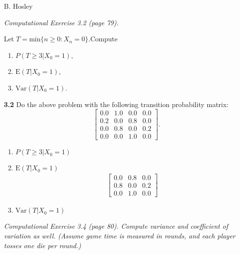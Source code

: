 \documentclass[answers]{exam}
\begin{document}
\hspace{\fill} {\large B. Hosley}
\bigskip


\begin{questions}

\question 
\textit{Computational Exercise 3.2 (page 79).}

Let \(T =\text{min}\{n\geq0:X_n =0\}\).Compute
\begin{enumerate}
	\item \(P(T \geq 3|X_0 = 1)\), 
	\item \(\text{E}(T|X_0 =1)\),
	\item \(\text{Var}(T |X_0 = 1)\).
\end{enumerate}


\textbf{3.2} Do the above problem with the following transition probability matrix:
\[\begin{bmatrix}
	0.0 & 1.0 & 0.0 & 0.0 \\
	0.2 & 0.0 & 0.8 & 0.0 \\
	0.0 & 0.8 & 0.0 & 0.2 \\
	0.0 & 0.0 & 1.0 & 0.0 
\end{bmatrix}.\]

\begin{solution}
\begin{enumerate}
	\item \(P(T \geq 3|X_0 = 1)\)
	
	
	\item \(\text{E}(T|X_0 =1)\)
	\begin{align*}
		\begin{bmatrix}
			0.0 & 0.8 & 0.0 \\
			0.8 & 0.0 & 0.2 \\
			0.0 & 1.0 & 0.0 
		\end{bmatrix}
	\end{align*}
	
	
	\item \(\text{Var}(T |X_0 = 1)\)
	
\end{enumerate}
\end{solution}

\question 
\textit{Computational Exercise 3.4 (page 80). 
	Compute variance and coefficient of variation as well. 
	(Assume game time is measured in rounds, 
	and each player tosses one die per round.)}



\end{questions}
\end{document}
